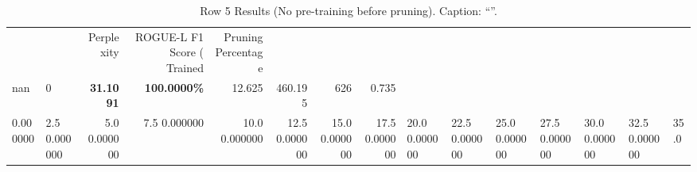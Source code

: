 \begin{table}
\caption{Row 5 Results (No pre-training before pruning). \ifshowcaption{}Caption: ``''.\fi}
\label{tab:evaluation-pipeline-5-untrained}
\begin{tabular}{llrrrrrr}
 &  & Perplexity & ROGUE-L F1 Score (%
Trained & Pruning Percentage &  &  &  &  &  &  \\
nan & 0 & \bfseries 31.1091 & \bfseries 100.0000\% & 12.625 & 460.195 & 626 & 0.735 \\
0.000000 & 2.5%
0.000000 & 5.0%
0.000000 & 7.5%
0.000000 & 10.0%
0.000000 & 12.5%
0.000000 & 15.0%
0.000000 & 17.5%
0.000000 & 20.0%
0.000000 & 22.5%
0.000000 & 25.0%
0.000000 & 27.5%
0.000000 & 30.0%
0.000000 & 32.5%
0.000000 & 35.0%

\end{tabular}
\end{table}
